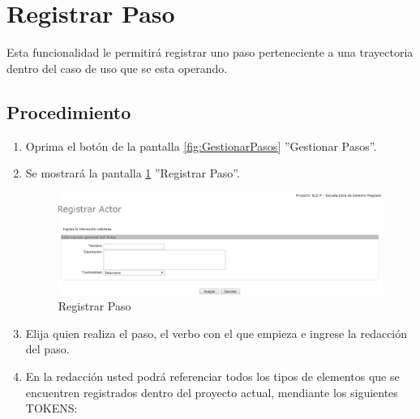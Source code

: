 
\hypertarget{cv:registrarPaso}{\section{Registrar Paso}} \label{sec:registrarPaso}

	Esta funcionalidad le permitirá registrar uno paso perteneciente a una trayectoria dentro del caso de uso que se esta operando.

		\subsection{Procedimiento}

			\begin{enumerate}
	
			\item Oprima el botón \IURegistrar{} de la pantalla \ref{fig:GestionarPasos} ''Gestionar Pasos''.
			
			\item Se mostrará la pantalla \ref{fig:registrarPaso} ''Registrar Paso''.

			\begin{figure}[H]
				\begin{center}
					\includegraphics[scale=0.5]{roles/lider/actor/pantallas/IU10-1registrarActor}
					\caption{Registrar Paso}
					\label{fig:registrarPaso}
				\end{center}
			\end{figure}
		
			\item Elija quien realiza el paso, el verbo con el que empieza e ingrese la redacción del paso.
			
			\item En la redacción usted podrá referenciar todos los tipos de elementos que se encuentren registrados dentro del proyecto actual, mendiante los siguientes TOKENS:
			

\end{enumerate}
